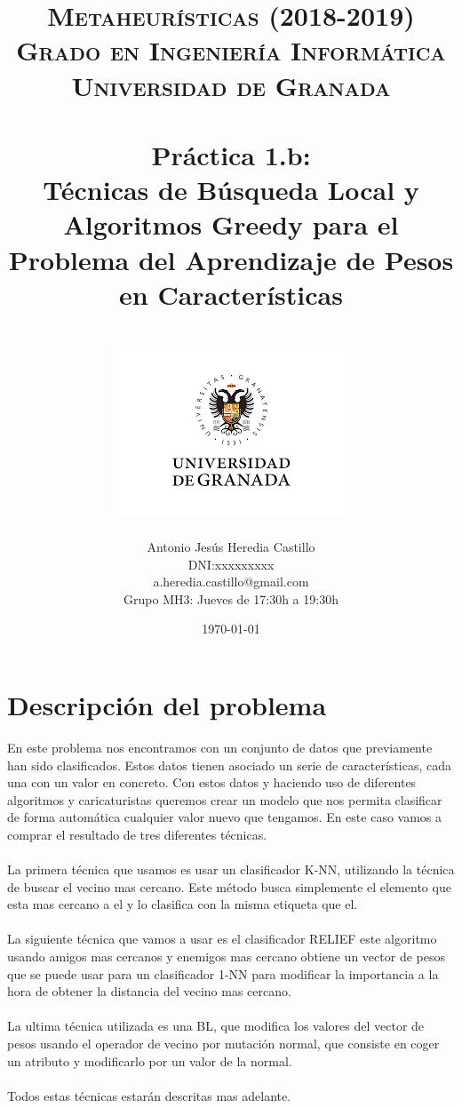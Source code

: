 \documentclass[12pt,a4paper]{article}
\title{
\normalfont \normalsize 
\textsc{{\bf Metaheurísticas (2018-2019)} \\ Grado en Ingeniería Informática \\ Universidad de Granada} \\ [20pt] %
\horrule{0.5pt} \\[0.4cm] %
{\huge Práctica 1.b:}\\
Técnicas de Búsqueda Local y Algoritmos Greedy
para el Problema del Aprendizaje de Pesos en
Características \\ %
\horrule{2pt} \\[0.5cm] %
\includegraphics{images/logo.png}	
}
\author{Antonio Jesús Heredia Castillo\\DNI:xxxxxxxxx\\a.heredia.castillo@gmail.com\\Grupo MH3: Jueves de 17:30h a 19:30h} %
\date{\normalsize\today} %
\begin{document}
\maketitle %
\newpage %
\tableofcontents %
\listoftables
\newpage

\section{Descripción del problema}
En este problema nos encontramos con un conjunto de datos que previamente han sido clasificados. Estos datos tienen asociado un serie de características, cada una con un valor en concreto. Con estos datos y haciendo uso de diferentes algoritmos y caricaturistas queremos crear un modelo que nos permita clasificar de forma automática cualquier valor nuevo que tengamos. En este caso vamos a comprar el resultado de tres diferentes técnicas.\\\\
La primera técnica que usamos es usar un clasificador K-NN,  utilizando la técnica de buscar el vecino mas cercano. Este método busca simplemente el elemento que esta mas cercano a el y lo clasifica con la misma etiqueta que el.\\\\
La siguiente técnica que vamos a usar es el clasificador RELIEF este algoritmo usando  amigos mas cercanos y enemigos mas cercano obtiene un vector de pesos que se puede usar para un clasificador 1-NN para modificar la importancia a la hora de obtener la distancia del vecino mas cercano.\\\\
La ultima técnica utilizada es una BL, que modifica los valores del vector de pesos usando el operador de vecino por mutación normal, que consiste en coger un atributo y modificarlo por un valor de la normal.\\\\

Todos estas técnicas estarán descritas mas adelante.
\end{document}
